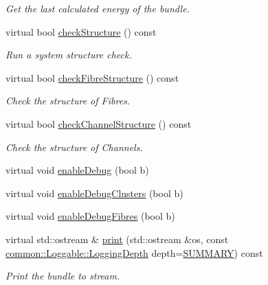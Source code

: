 \begin{DoxyCompactItemize}
\begin{DoxyCompactList}\small\item\em \-Get the last calculated energy of the bundle. \end{DoxyCompactList}\item 
virtual bool \hyperlink{classcryomesh_1_1structures_1_1Bundle_a5927b1a21111e6b78c143280c49a9701}{check\-Structure} () const 
\begin{DoxyCompactList}\small\item\em \-Run a system structure check. \end{DoxyCompactList}\item 
virtual bool \hyperlink{classcryomesh_1_1structures_1_1Bundle_a441eda1670224083d5efc20b3a6bb9ff}{check\-Fibre\-Structure} () const 
\begin{DoxyCompactList}\small\item\em \-Check the structure of \-Fibres. \end{DoxyCompactList}\item 
virtual bool \hyperlink{classcryomesh_1_1structures_1_1Bundle_a1c1b3a4fe6d32259753d69c8a9b0deaa}{check\-Channel\-Structure} () const 
\begin{DoxyCompactList}\small\item\em \-Check the structure of \-Channels. \end{DoxyCompactList}\item 
virtual void \hyperlink{classcryomesh_1_1structures_1_1Bundle_abe63fcceae95f0ffb06db094076b42c5}{enable\-Debug} (bool b)
\item 
virtual void \hyperlink{classcryomesh_1_1structures_1_1Bundle_a8e7f1752b8b0112adf8939921eff4e50}{enable\-Debug\-Clusters} (bool b)
\item 
virtual void \hyperlink{classcryomesh_1_1structures_1_1Bundle_a742597fd733573d8242966f89f8e6715}{enable\-Debug\-Fibres} (bool b)
\item 
virtual std\-::ostream \& \hyperlink{classcryomesh_1_1structures_1_1Bundle_a1b2bdda71a78b4e89af23f21e7611ee4}{print} (std\-::ostream \&os, const \hyperlink{classcryomesh_1_1common_1_1Loggable_a4d85401f6c81bc8ed94e49d66ae574c5}{common\-::\-Loggable\-::\-Logging\-Depth} depth=\hyperlink{classcryomesh_1_1common_1_1Loggable_a4d85401f6c81bc8ed94e49d66ae574c5a51f5abcf5a53a8930a09b065fc64a44f}{\-S\-U\-M\-M\-A\-R\-Y}) const 
\begin{DoxyCompactList}\small\item\em \-Print the bundle to stream. \end{DoxyCompactList}\item 

\end{DoxyCompactItemize}
